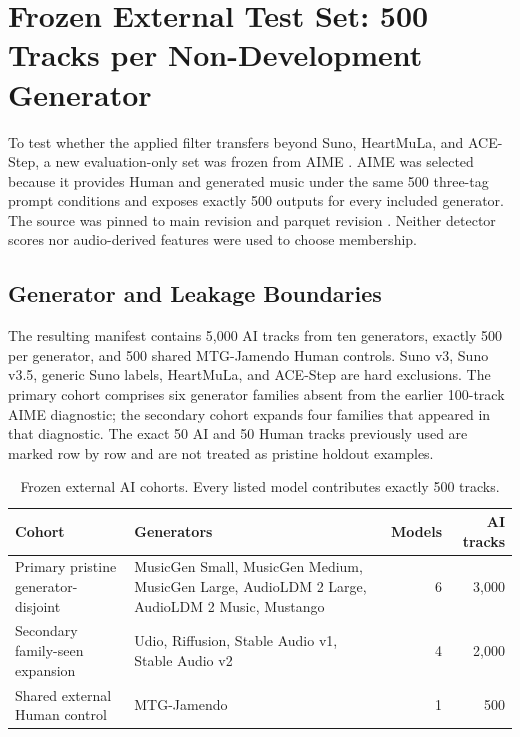 \section{Frozen External Test Set: 500 Tracks per Non-Development Generator}
\label{sec:external-generator-500}

To test whether the applied filter transfers beyond Suno, HeartMuLa, and
ACE-Step, a new evaluation-only set was frozen from AIME
\citep{aime2025,aimehf2026}. AIME was selected because it provides Human and
generated music under the same 500 three-tag prompt conditions and exposes
exactly 500 outputs for every included generator. The source was pinned to main
revision
 and parquet revision
. Neither detector scores nor
audio-derived features were used to choose membership.

\subsection{Generator and Leakage Boundaries}

The resulting manifest contains 5,000 AI tracks from ten generators, exactly
500 per generator, and 500 shared MTG-Jamendo Human controls. Suno v3, Suno
v3.5, generic Suno labels, HeartMuLa, and ACE-Step are hard exclusions. The
primary cohort comprises six generator families absent from the earlier
100-track AIME diagnostic; the secondary cohort expands four families that
appeared in that diagnostic. The exact 50 AI and 50 Human tracks previously
used are marked row by row and are not treated as pristine holdout examples.

\begin{table}[H]
\centering
\small
\caption{Frozen external AI cohorts. Every listed model contributes exactly 500 tracks.}
\label{tab:external-generator-cohorts}
\begin{tabularx}{\linewidth}{lXrr}
\toprule
Cohort & Generators & Models & AI tracks \\
\midrule
Primary pristine generator-disjoint & MusicGen Small, MusicGen Medium, MusicGen Large, AudioLDM 2 Large, AudioLDM 2 Music, Mustango & 6 & 3,000 \\
Secondary family-seen expansion & Udio, Riffusion, Stable Audio v1, Stable Audio v2 & 4 & 2,000 \\
Shared external Human control & MTG-Jamendo & 1 & 500 \\
\bottomrule
\end{tabularx}
\end{table}

